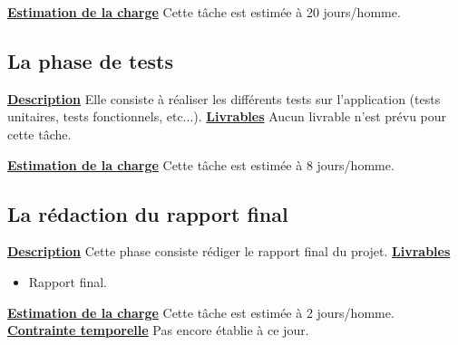\documentclass[overfullbox]{polytech/polytech}
\begin{document}
\textbf{\underline{Estimation de la charge}}
\newline
\newline
Cette tâche est estimée à 20 jours/homme.

\subsection{La phase de tests}
\textbf{\underline{Description}}
\newline
\newline
Elle consiste à réaliser les différents tests sur l’application (tests unitaires, tests fonctionnels, etc...).
\newline
\newline
\textbf{\underline{Livrables}}
\newline
\newline
Aucun livrable n'est prévu pour cette tâche.
\newline
\newline

\textbf{\underline{Estimation de la charge}}
\newline
\newline
Cette tâche est estimée à 8 jours/homme.

\subsection{La rédaction du rapport final}
\textbf{\underline{Description}}
\newline
\newline
Cette phase consiste rédiger le rapport final du projet.
\newline
\newline
\textbf{\underline{Livrables}}

\begin{itemize}
\item Rapport final.
\newline
\end{itemize}	

\textbf{\underline{Estimation de la charge}}
\newline
\newline
Cette tâche est estimée à 2 jours/homme. 
\newline
\newline
\textbf{\underline{Contrainte temporelle}}
\newline
\newline
Pas encore établie à ce jour.
\end{document}
